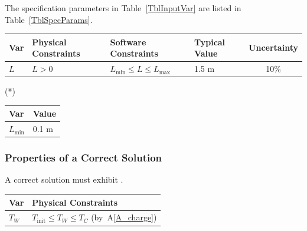 \documentclass[12pt]{article}
\newcommand{\aref}[1]{A\ref{#1}}
\begin{document}
The specification parameters in Table~\ref{TblInputVar} are listed in
Table~\ref{TblSpecParams}.

\begin{table}[!h]
  \caption{Input Variables} \label{TblInputVar}
  \renewcommand{\arraystretch}{1.2}
\noindent \begin{longtable*}{l l l l c} 
  \toprule
  \textbf{Var} & \textbf{Physical Constraints} & \textbf{Software Constraints} &
                             \textbf{Typical Value} & \textbf{Uncertainty}\\
  \midrule 
  $L$ & $L > 0$ & $L_{\text{min}} \leq L \leq L_{\text{max}}$ & 1.5 \si[per-mode=symbol] {\metre} & 10\%
  \\
  \bottomrule
\end{longtable*}
\end{table}

\noindent 
\begin{description}
\item[(*)] 
\end{description}

\begin{table}[!h]
\caption{Specification Parameter Values} \label{TblSpecParams}
\renewcommand{\arraystretch}{1.2}
\noindent \begin{longtable*}{l l} 
  \toprule
  \textbf{Var} & \textbf{Value} \\
  \midrule 
  $L_\text{min}$ & 0.1 \si{\metre}\\
  \bottomrule
\end{longtable*}
\end{table}

\subsubsection{Properties of a Correct Solution} \label{sec_CorrectSolution}

\noindent
A correct solution must exhibit .  

\begin{table}[!h]
\caption{Output Variables} \label{TblOutputVar}
\renewcommand{\arraystretch}{1.2}
\noindent \begin{longtable*}{l l} 
  \toprule
  \textbf{Var} & \textbf{Physical Constraints} \\
  \midrule 
  $T_W$ & $T_\text{init} \leq T_W \leq T_C$ (by~\aref{A_charge})
  \\
  \bottomrule
\end{longtable*}
\end{table}
\end{document}
